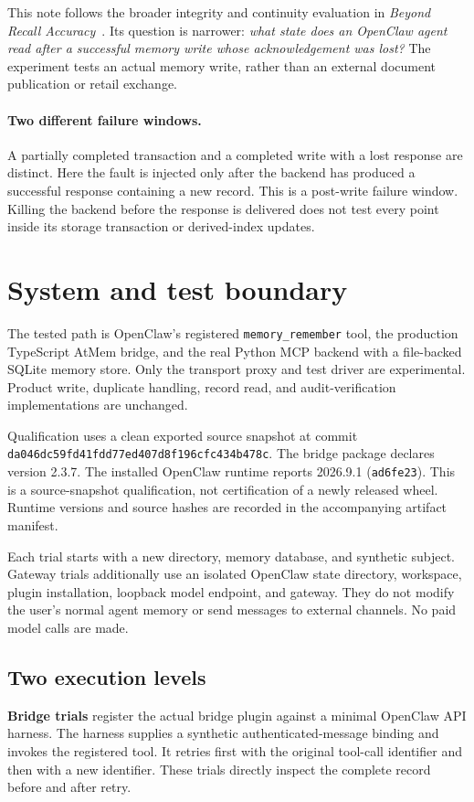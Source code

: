 \documentclass[10pt,twocolumn]{article}
\begin{document}
This note follows the broader integrity and continuity evaluation in
\emph{Beyond Recall Accuracy}~\cite{taghia2026beyond}. Its question is narrower:
\emph{what state does an OpenClaw agent read after a successful memory write
whose acknowledgement was lost?} The experiment tests an actual memory write,
rather than an external document publication or retail exchange.

\paragraph{Two different failure windows.}
A partially completed transaction and a completed write with a lost response
are distinct. Here the fault is injected only after the backend has produced a
successful response containing a new record. This is a post-write failure
window. Killing the backend before the response is delivered does not test
every point inside its storage transaction or derived-index updates.

\section{System and test boundary}
The tested path is OpenClaw's registered \texttt{memory\_remember} tool,
the production TypeScript AtMem bridge, and the real Python MCP backend
with a file-backed SQLite memory store. Only the transport proxy and test
driver are experimental. Product write, duplicate handling, record read, and
audit-verification implementations are unchanged.

Qualification uses a clean exported source snapshot at commit
\nolinkurl{da046dc59fd41fdd77ed407d8f196cfc434b478c}.
The bridge package declares version 2.3.7. The installed OpenClaw runtime
reports 2026.9.1 (\texttt{ad6fe23}). This is a source-snapshot qualification,
not certification of a newly released wheel. Runtime versions and source
hashes are recorded in the accompanying artifact manifest.

Each trial starts with a new directory, memory database, and synthetic
subject. Gateway trials additionally use an isolated OpenClaw state directory,
workspace, plugin installation, loopback model endpoint, and gateway. They do
not modify the user's normal agent memory or send messages to external
channels. No paid model calls are made.

\subsection{Two execution levels}
\textbf{Bridge trials} register the actual bridge plugin against a minimal
OpenClaw API harness. The harness supplies a synthetic authenticated-message
binding and invokes the registered tool. It retries first with the original
tool-call identifier and then with a new identifier. These trials directly
inspect the complete record before and after retry.
\end{document}
